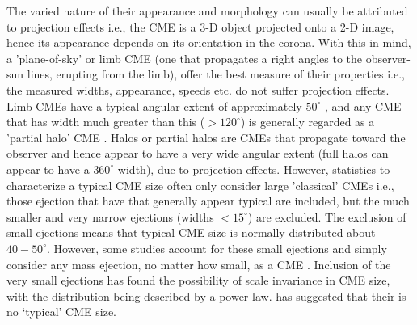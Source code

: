 The varied nature of their appearance and morphology can usually be attributed to projection effects \citep{burk2004} i.e., the CME is a 3-D object projected onto a 2-D image, hence its appearance depends on its orientation in the corona. With this in mind, a 'plane-of-sky' or limb CME (one that propagates a right angles to the observer-sun lines, erupting from the limb), offer the best measure of their properties i.e., the measured widths, appearance, speeds etc. do not suffer projection effects. Limb CMEs have a typical angular extent of approximately $50^{\circ}$ \citep{burk2004}, and any CME that has width much greater than this ($>120^{\circ}$) is generally regarded as a 'partial halo' CME \citep{yashiro2004}. Halos or partial halos are CMEs that propagate toward the observer and hence appear to have a very wide angular extent (full halos can appear to have a $360^{\circ}$ width), due to projection effects. However, statistics to characterize a typical CME size often only consider large 'classical' CMEs i.e., those ejection that have that generally appear typical are included, but the much smaller and very narrow ejections (widths $<15^{\circ}$) are excluded. The exclusion of small ejections means that typical CME size is normally distributed about $40-50^{\circ}$. However, some studies account for these small ejections and simply consider any mass ejection, no matter how small, as a CME \citep{robb2009}. Inclusion of the very small ejections has found the possibility of scale invariance in CME size, with the distribution being described by a power law. \citet{robb2009} has suggested that their is no \textquoteleft typical' CME size.



